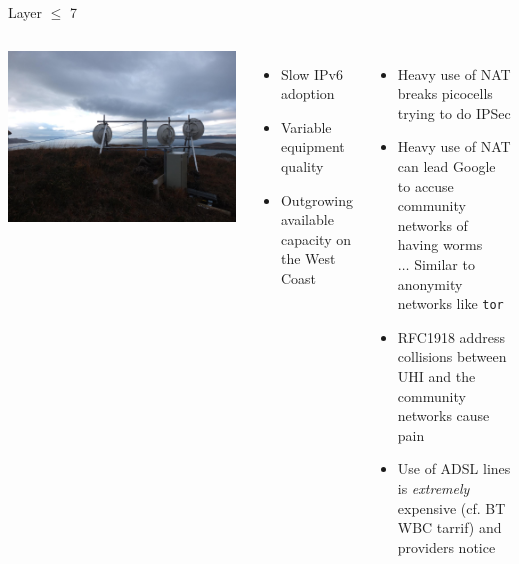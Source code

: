 \documentclass{beamer}
\begin{document}
\begin{frame}{Layer $\leq$ 7}
  \begin{columns}
    \includegraphics[width=\textwidth]{creagan-dearga-mast.jpg}\\
    \begin{itemize}
      \item Slow IPv6 adoption
      \item Variable equipment quality
      \item Outgrowing available capacity on the West
        Coast
    \end{itemize}
    \begin{itemize}
      \item Heavy use of NAT breaks picocells trying to do IPSec
      \item Heavy use of NAT can lead Google to accuse community
        networks of having worms\\
        $\ldots$ Similar to anonymity networks like \texttt{tor}
      \item RFC1918 address collisions between UHI and the community
        networks cause pain
      \item Use of ADSL lines is \textit{extremely} expensive (cf.
        BT WBC tarrif) and providers notice
    \end{itemize}
  \end{columns}
\end{frame}
\end{document}
